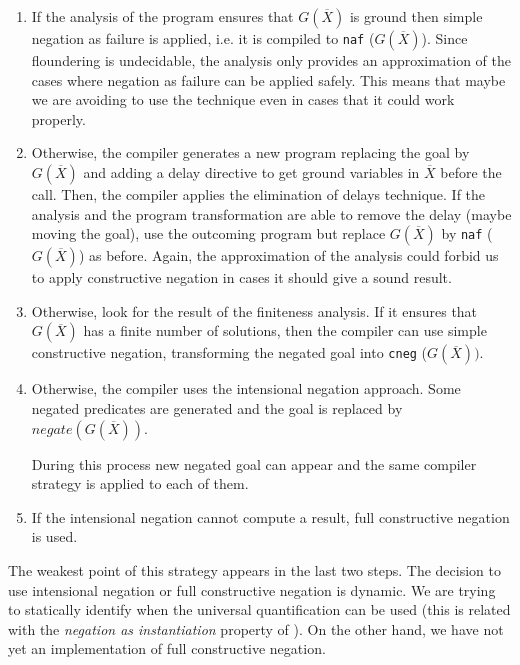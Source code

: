 \documentclass[]{llncs}
\begin{document}
\begin{enumerate}
\item If the analysis of the program ensures that $G (\overline{X})$
is ground then simple negation as failure is applied, i.e. it
is compiled to {\tt naf} ($G (\overline{X})$). Since floundering is
undecidable, the analysis only provides an approximation of the cases
where negation as failure can be applied safely. This means that
maybe we are avoiding to use the technique even in cases that it
could work properly.

\item Otherwise, the compiler generates a new program
replacing the goal by $G (\overline{X})$ and adding a delay
directive to get ground variables in $\overline{X}$ before the call.
Then, the compiler applies the elimination of delays technique.
If the analysis and the program transformation are able to remove
the delay (maybe moving the goal), use the outcoming program but
replace $G (\overline{X})$ by {\tt naf} ($G (\overline{X})$)
as before. Again, the approximation of the analysis could forbid
us to apply constructive negation in cases it should give a sound
result.

\item Otherwise, look for the result of the finiteness analysis.
If it ensures that $G (\overline{X})$
has a finite number of solutions, then the compiler can use simple
constructive negation, transforming the negated goal into
{\tt cneg} ($G (\overline{X}))$.

\item Otherwise, the compiler uses the intensional negation approach.
Some negated predicates are generated and the goal is replaced by
$negate (G (\overline{X}))$.

During this process new negated goal can appear and the same
compiler strategy is applied to each of them.

\item If the intensional negation cannot compute a result, full
constructive negation is used.
\end{enumerate}

The weakest point of this strategy appears in the last two steps. The
decision to use intensional negation or full constructive negation is
dynamic. We are trying to statically identify when the universal
quantification can be used (this is related with the {\em negation as
  instantiation} property of \cite{nai}).  On the other hand, we have
not yet an implementation of full constructive negation.
\end{document}
